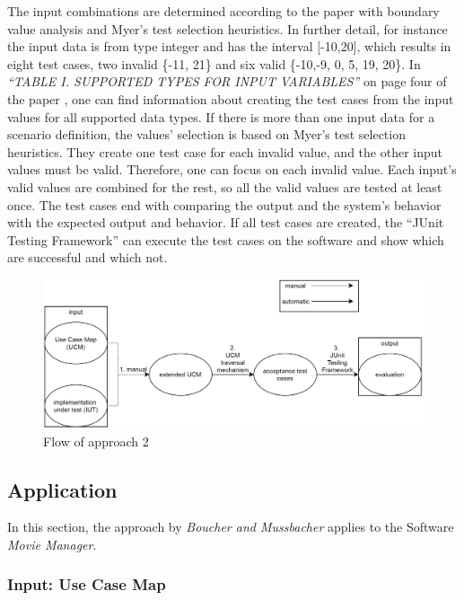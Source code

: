 The input combinations are determined according to the paper with boundary value analysis and Myer's test selection heuristics. In further detail, for instance the input data is from type integer and has the interval [-10,20], which results in eight test cases, two invalid \{-11, 21\} and six valid \{-10,-9, 0, 5, 19, 20\}. In \textit{\enquote{TABLE I. SUPPORTED TYPES FOR INPUT VARIABLES}} on page four of the paper \cite{BoucherMussbacher2017}, one can find information about creating the test cases from the input values for all supported data types. If there is more than one input data for a scenario definition, the values' selection is based on Myer's test selection heuristics. They create one test case for each invalid value, and the other input values must be valid. Therefore, one can focus on each invalid value. Each input's valid values are combined for the rest, so all the valid values are tested at least once. The test cases end with comparing the output and the system's behavior with the expected output and behavior. If all test cases are created, the \enquote{JUnit Testing Framework} can execute the test cases on the software and show which are successful and which not.

\begin{figure}[h]
	\centering
	\includegraphics[scale=0.4]{../images/08/08_controllFlow2.jpg} 
	\caption{Flow of approach 2}
	\label{fig:08_flowOf2}
\end{figure}
\subsection{Application}

In this section, the approach by \textit{Boucher and Mussbacher} applies to the Software \textit{Movie Manager}.

\subsubsection{Input: Use Case Map}

